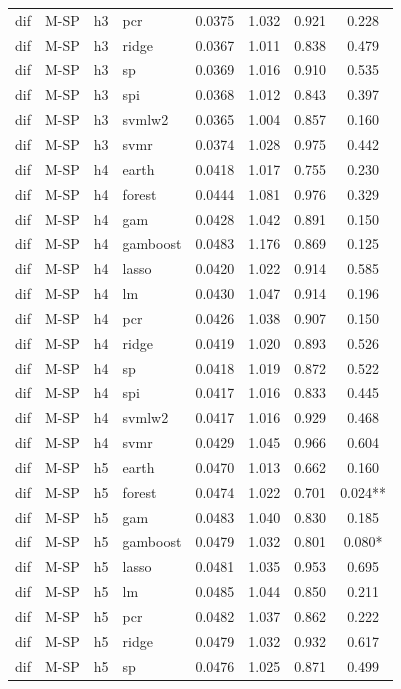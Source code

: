 \begin{ThreePartTable}
\begin{longtable}[t]{llclcccc}
dif & M-SP & h3 & pcr & 0.0375 & 1.032 & 0.921 & 0.228\\
dif & M-SP & h3 & ridge & 0.0367 & 1.011 & 0.838 & 0.479\\
dif & M-SP & h3 & sp & 0.0369 & 1.016 & 0.910 & 0.535\\
dif & M-SP & h3 & spi & 0.0368 & 1.012 & 0.843 & 0.397\\
dif & M-SP & h3 & svmlw2 & 0.0365 & 1.004 & 0.857 & 0.160\\
dif & M-SP & h3 & svmr & 0.0374 & 1.028 & 0.975 & 0.442\\
\addlinespace
dif & M-SP & h4 & earth & 0.0418 & 1.017 & 0.755 & 0.230\\
dif & M-SP & h4 & forest & 0.0444 & 1.081 & 0.976 & 0.329\\
dif & M-SP & h4 & gam & 0.0428 & 1.042 & 0.891 & 0.150\\
dif & M-SP & h4 & gamboost & 0.0483 & 1.176 & 0.869 & 0.125\\
dif & M-SP & h4 & lasso & 0.0420 & 1.022 & 0.914 & 0.585\\
dif & M-SP & h4 & lm & 0.0430 & 1.047 & 0.914 & 0.196\\
dif & M-SP & h4 & pcr & 0.0426 & 1.038 & 0.907 & 0.150\\
dif & M-SP & h4 & ridge & 0.0419 & 1.020 & 0.893 & 0.526\\
dif & M-SP & h4 & sp & 0.0418 & 1.019 & 0.872 & 0.522\\
dif & M-SP & h4 & spi & 0.0417 & 1.016 & 0.833 & 0.445\\
dif & M-SP & h4 & svmlw2 & 0.0417 & 1.016 & 0.929 & 0.468\\
dif & M-SP & h4 & svmr & 0.0429 & 1.045 & 0.966 & 0.604\\
\addlinespace
dif & M-SP & h5 & earth & 0.0470 & 1.013 & 0.662 & 0.160\\
dif & M-SP & h5 & forest & 0.0474 & 1.022 & 0.701 & 0.024**\\
dif & M-SP & h5 & gam & 0.0483 & 1.040 & 0.830 & 0.185\\
dif & M-SP & h5 & gamboost & 0.0479 & 1.032 & 0.801 & 0.080*\\
dif & M-SP & h5 & lasso & 0.0481 & 1.035 & 0.953 & 0.695\\
dif & M-SP & h5 & lm & 0.0485 & 1.044 & 0.850 & 0.211\\
dif & M-SP & h5 & pcr & 0.0482 & 1.037 & 0.862 & 0.222\\
dif & M-SP & h5 & ridge & 0.0479 & 1.032 & 0.932 & 0.617\\
dif & M-SP & h5 & sp & 0.0476 & 1.025 & 0.871 & 0.499\\

\end{longtable}
\end{ThreePartTable}
